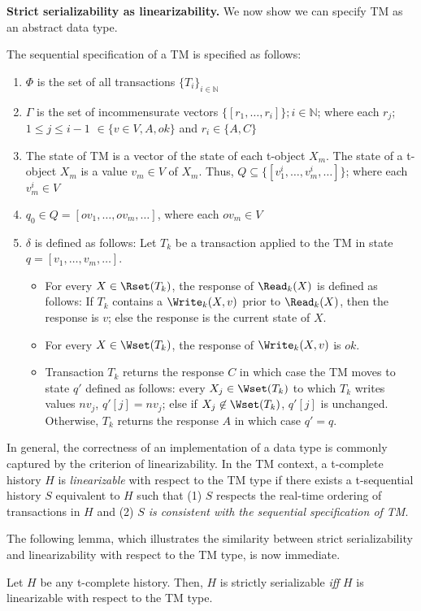 \vspace{1mm}\noindent\textbf{Strict serializability as linearizability.}
We now show we can specify TM as an abstract data type.

The sequential specification of a TM is specified as follows:
\begin{enumerate}
\item
$\Phi$ is the set of all transactions $\{T_i\}_{i\in \mathbb{N}}$
\item 
$\Gamma$ is the set of incommensurate vectors $\{[r_1,\ldots, r_i ]\};i\in \mathbb{N}$; where each 
$r_j$; $1\leq j \leq i-1$ $\in \{v \in V, A, ok\}$ and $r_i \in \{A,C\}$
\item 
The state of TM is a vector of the state of each t-object $X_m$.
The state of a t-object $X_m$ is a value $v_m\in V$ of $X_m$.
Thus, $Q \subseteq \{ [v^i_1,\ldots, v^i_m, \ldots ]\}$; where each $v^i_m \in V$
\item 
$q_0 \in Q=[ov_1,\ldots, ov_m,\ldots ]$, where each $ov_m\in V$
\item 
$\delta$ is defined as follows:
Let $T_k$ be a transaction
applied to the TM in state $q=[v_1,\ldots, v_m, \ldots]$.
\begin{itemize}
\item For every $X\in \Rset(T_k)$, the response of $\Read_k(X)$ is defined as follows:
If $T_k$ contains a $\Write_k(X,v)$ prior to $\Read_k(X)$, then the response is $v$; else the response is the current state of $X$.
\item 
For every $X\in \Wset(T_k)$, the response of $\Write_k(X,v)$ is $ok$.
\item
Transaction $T_k$ returns the response $C$ in which case the TM moves to state $q'$ defined as follows:
every $X_j\in \Wset(T_k)$ to which $T_k$ writes values $nv_j$, $q'[j]=nv_j$; else if $X_j\not\in \Wset(T_k)$, $q'[j]$ is unchanged.
Otherwise, $T_k$ returns the response $A$ in which case $q'=q$.
\end{itemize}
\end{enumerate}
In general, the correctness of an implementation of a data type is commonly captured by the criterion 
of linearizability.
In the TM context, a t-complete history $H$ is \emph{linearizable} with 
respect to the TM type if there exists
a t-sequential history $S$ equivalent to $H$ such that
(1) $S$ respects the real-time ordering of transactions in $H$ and
(2) \emph{$S$ is consistent with the sequential specification of TM}.

The following lemma, which illustrates the similarity between strict serializability
and linearizability with respect to the TM type, is now immediate.
\begin{lemma}
\label{lm:serlin}
Let $H$ be any t-complete history. Then, $H$ is strictly serializable \emph{iff} $H$ is linearizable with respect to the
TM type.
\end{lemma}

